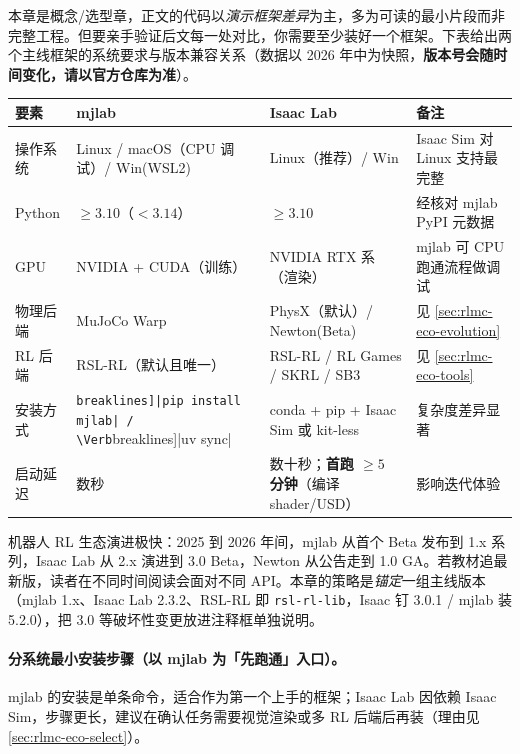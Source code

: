 本章是概念/选型章，正文的代码以\emph{演示框架差异}为主，多为可读的最小片段而非完整工程。但要亲手验证后文每一处对比，你需要至少装好一个框架。下表给出两个主线框架的系统要求与版本兼容关系（数据以 2026 年中为快照，\textbf{版本号会随时间变化，请以官方仓库为准}）。

\begin{center}
\small
\begin{tabularx}{\linewidth}{@{}lLLL@{}}
\toprule
要素 & mjlab & Isaac Lab & 备注 \\
\midrule
操作系统 & Linux / macOS（CPU 调试）/ Win(WSL2) & Linux（推荐）/ Win & Isaac Sim 对 Linux 支持最完整 \\
Python & $\ge 3.10$（$<3.14$） & $\ge 3.10$ & 经核对 mjlab PyPI 元数据\,\cite{mjlab2026} \\
GPU & NVIDIA + CUDA（训练）& NVIDIA RTX 系（渲染）& mjlab 可 CPU 跑通流程做调试 \\
物理后端 & MuJoCo Warp & PhysX（默认）/ Newton(Beta) & 见 \cref{sec:rlmc-eco-evolution} \\
RL 后端 & RSL-RL（默认且唯一）& RSL-RL / RL Games / SKRL / SB3 & 见 \cref{sec:rlmc-eco-tools} \\
安装方式 & \Verb[breaklines]|pip install mjlab| / \Verb[breaklines]|uv sync| & conda + pip + Isaac Sim 或 kit-less & 复杂度差异显著 \\
启动延迟 & 数秒 & 数十秒；\textbf{首跑 $\ge 5$ 分钟}（编译 shader/USD）& 影响迭代体验 \\
\bottomrule
\end{tabularx}
\end{center}

\begin{note}
机器人 RL 生态演进极快：2025 到 2026 年间，mjlab 从首个 Beta 发布到 1.x 系列，Isaac Lab 从 2.x 演进到 3.0 Beta，Newton 从公告走到 1.0 GA。若教材追最新版，读者在不同时间阅读会面对不同 API。本章的策略是\emph{锚定}一组主线版本（mjlab 1.x、Isaac Lab 2.3.2、RSL-RL 即 \texttt{rsl-rl-lib}，Isaac 钉 3.0.1 / mjlab 装 5.2.0），把 3.0 等破坏性变更放进注释框单独说明。
\end{note}

\paragraph{分系统最小安装步骤（以 mjlab 为「先跑通」入口）。}mjlab 的安装是单条命令，适合作为第一个上手的框架；Isaac Lab 因依赖 Isaac Sim，步骤更长，建议在确认任务需要视觉渲染或多 RL 后端后再装（理由见 \cref{sec:rlmc-eco-select}）。

